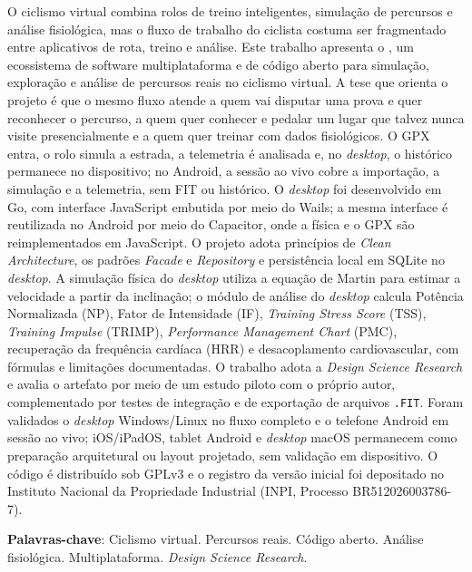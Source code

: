 
\begin{resumo}

O ciclismo virtual combina rolos de treino inteligentes, simulação de percursos
e análise fisiológica, mas o fluxo de trabalho do ciclista costuma ser
fragmentado entre aplicativos de rota, treino e análise. Este trabalho
apresenta o \argus{}, um ecossistema de software multiplataforma e de código
aberto para simulação, exploração e análise de percursos reais no ciclismo
virtual. A tese que orienta o projeto é que o mesmo fluxo atende a quem vai
disputar uma prova e quer reconhecer o percurso, a quem quer conhecer e pedalar
um lugar que talvez nunca visite presencialmente e a quem quer treinar com
dados fisiológicos. O GPX entra, o rolo simula a estrada, a telemetria é
analisada e, no \textit{desktop}, o histórico permanece no dispositivo; no
Android, a sessão ao vivo cobre a importação, a simulação e a telemetria, sem
FIT ou histórico. O \textit{desktop} foi desenvolvido em Go, com interface
JavaScript embutida por meio do Wails; a mesma interface é reutilizada no
Android por meio do Capacitor, onde a física e o GPX são reimplementados em
JavaScript. O projeto adota princípios de \textit{Clean Architecture}, os
padrões \textit{Facade} e \textit{Repository} e persistência local em SQLite no
\textit{desktop}. A simulação física do \textit{desktop} utiliza a equação de
Martin para estimar a velocidade a partir da inclinação; o módulo de análise do
\textit{desktop} calcula Potência Normalizada (NP), Fator de Intensidade (IF),
\textit{Training Stress Score} (TSS), \textit{Training Impulse} (TRIMP),
\textit{Performance Management Chart} (PMC), recuperação da frequência cardíaca
(HRR) e desacoplamento cardiovascular, com fórmulas e limitações documentadas.
O trabalho adota a \textit{Design Science Research} e avalia o artefato por meio
de um estudo piloto com o próprio autor, complementado por testes de integração
e de exportação de arquivos \texttt{.FIT}. Foram validados o \textit{desktop}
Windows/Linux no fluxo completo e o telefone Android em sessão ao vivo;
iOS/iPadOS, tablet Android e \textit{desktop} macOS permanecem como preparação
arquitetural ou layout projetado, sem validação em dispositivo. O código é distribuído sob GPLv3 e o registro da
versão inicial foi depositado no Instituto Nacional da Propriedade Industrial
(INPI, Processo BR512026003786-7).

\textbf{Palavras-chave}: Ciclismo virtual. Percursos reais. Código aberto.
Análise fisiológica. Multiplataforma. \textit{Design Science Research}.

\end{resumo}
